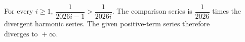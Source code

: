 For every $i\ge1$, $\dfrac{1}{2026i-1}>\dfrac{1}{2026i}$. The comparison series is $\dfrac{1}{2026}$ times the divergent harmonic series. The given positive-term series therefore $\boxed{\text{diverges to }+\infty}$.
